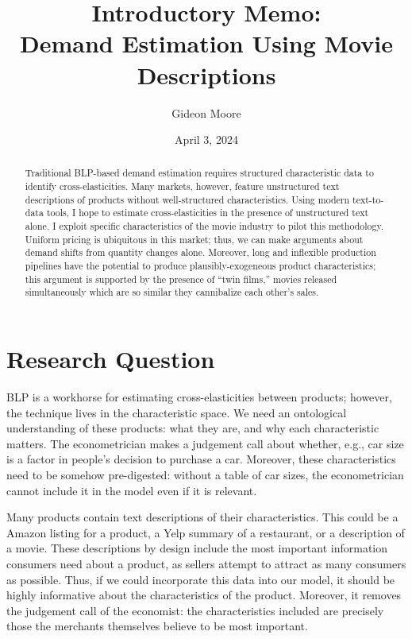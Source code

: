 \documentclass{article}
\author{Gideon Moore}
\date{April 3, 2024}
\title{Introductory Memo: \\ Demand Estimation Using Movie Descriptions}
\begin{document}
\maketitle

\begin{abstract}
    Traditional BLP-based demand estimation requires structured characteristic data to identify cross-elasticities. Many markets, however, feature unstructured text descriptions of products without well-structured characteristics. Using modern text-to-data tools, I hope to estimate cross-elasticities in the presence of unstructured text alone. I exploit specific characteristics of the movie industry to pilot this methodology. Uniform pricing is ubiquitous in this market; thus, we can make arguments about demand shifts from quantity changes alone. Moreover, long and inflexible production pipelines have the potential to produce plausibly-exogeneous product characteristics; this argument is supported by the presence of ``twin films,'' movies released simultaneously which are so similar they cannibalize each other's sales. 
\end{abstract}

\section{Research Question}

BLP is a workhorse for estimating cross-elasticities between products; however, the technique lives in the characteristic space. We need an ontological understanding of these products: what they are, and why each characteristic matters. The econometrician makes a judgement call about whether, e.g., car size is a factor in people's decision to purchase a car. Moreover, these characteristics need to be somehow pre-digested: without a table of car sizes, the econometrician cannot include it in the model even if it is relevant.

Many products contain text descriptions of their characteristics. This could be a Amazon listing for a product, a Yelp summary of a restaurant, or a description of a movie. These descriptions by design include the most important information consumers need about a product, as sellers attempt to attract as many consumers as possible. Thus, if we could incorporate this data into our model, it should be highly informative about the characteristics of the product. Moreover, it removes the judgement call of the economist: the characteristics included are precisely those the merchants themselves believe to be most important. 
\end{document}
